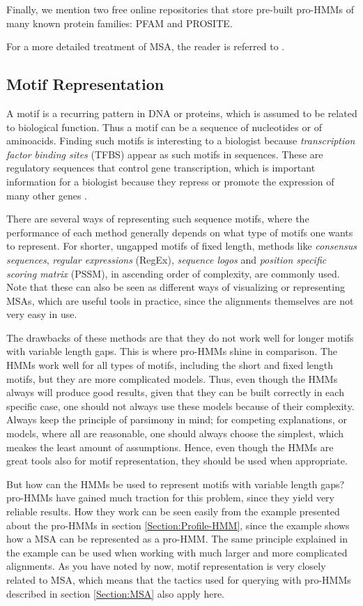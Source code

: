 \documentclass{article}\usepackage[]{graphicx}\usepackage[]{color}
\begin{document}
Finally, we mention two free online repositories that store pre-built pro-HMMs of many known protein families: PFAM and PROSITE. 

For a more detailed treatment of MSA, the reader is referred to \cite{Durbin1998}.

\subsection{Motif Representation}\label{Section:Motivs}
A motif is a recurring pattern in DNA or proteins, which is assumed to be related to biological function. Thus a motif can be a sequence of nucleotides or of aminoacids. Finding such motifs is interesting to a biologist because \textit{transcription factor binding sites} (TFBS) appear as such motifs in sequences. These are regulatory sequences that control gene transcription, which is important information for a biologist because they repress or promote the expression of many other genes \cite{Christianini2006}.

There are several ways of representing such sequence motifs, where the performance of each method generally depends on what type of motifs one wants to represent. For shorter, ungapped motifs of fixed length, methods like \textit{consensus sequences}, \textit{regular expressions} (RegEx), \textit{sequence logos} and \textit{position specific scoring matrix} (PSSM), in ascending order of complexity, are commonly used. Note that these can also be seen as different ways of visualizing or representing MSAs, which are useful tools in practice, since the alignments themselves are not very easy in use. 

The drawbacks of these methods are that they do not work well for longer motifs with variable length gaps. This is where pro-HMMs shine in comparison. The HMMs work well for all types of motifs, including the short and fixed length motifs, but they are more complicated models. Thus, even though the HMMs always will produce good results, given that they can be built correctly in each specific case, one should not always use these models because of their complexity. Always keep the principle of parsimony in mind; for competing explanations, or models, where all are reasonable, one should always choose the simplest, which meakes the least amount of assumptions. Hence, even though the HMMs are great tools also for motif representation, they should be used when appropriate. 

But how can the HMMs be used to represent motifs with variable length gaps? pro-HMMs have gained much traction for this problem, since they yield very reliable results. How they work can be seen easily from the example presented about the pro-HMMs in section \ref{Section:Profile-HMM}, since the example shows how a MSA can be represented as a pro-HMM. The same principle explained in the example can be used when working with much larger and more complicated alignments. As you have noted by now, motif representation is very closely related to MSA, which means that the tactics used for querying with pro-HMMs described in section \ref{Section:MSA} also apply here. 
\end{document}
